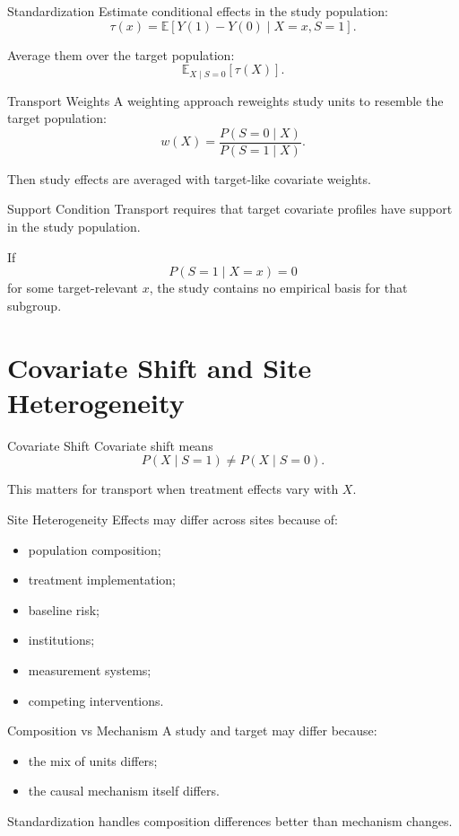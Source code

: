 \documentclass[aspectratio=169,11pt]{beamer}
\newcommand{\E}{\mathbb{E}}
\begin{document}
\begin{frame}{Standardization}
Estimate conditional effects in the study population:
\[
\tau(x)=\E[Y(1)-Y(0)\mid X=x,S=1].
\]

Average them over the target population:
\[
\E_{X\mid S=0}[\tau(X)].
\]
\end{frame}

\begin{frame}{Transport Weights}
A weighting approach reweights study units to resemble the target population:
\[
w(X)=\frac{P(S=0\mid X)}{P(S=1\mid X)}.
\]

Then study effects are averaged with target-like covariate weights.
\end{frame}

\begin{frame}{Support Condition}
Transport requires that target covariate profiles have support in the study population.

If
\[
P(S=1\mid X=x)=0
\]
for some target-relevant \(x\), the study contains no empirical basis for that subgroup.
\end{frame}

\section{Covariate Shift and Site Heterogeneity}

\begin{frame}{Covariate Shift}
Covariate shift means
\[
P(X\mid S=1) \neq P(X\mid S=0).
\]

This matters for transport when treatment effects vary with \(X\).
\end{frame}

\begin{frame}{Site Heterogeneity}
Effects may differ across sites because of:
\begin{itemize}
\item population composition;
\item treatment implementation;
\item baseline risk;
\item institutions;
\item measurement systems;
\item competing interventions.
\end{itemize}
\end{frame}

\begin{frame}{Composition vs Mechanism}
A study and target may differ because:
\begin{itemize}
\item the mix of units differs;
\item the causal mechanism itself differs.
\end{itemize}

Standardization handles composition differences better than mechanism changes.
\end{frame}
\end{document}
